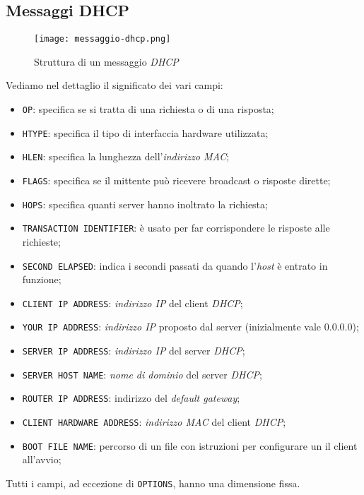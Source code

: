 \subsection{Messaggi DHCP}
\begin{figure}[h!]
    \centering
    \texttt{[image: messaggio-dhcp.png]}
    \caption{Struttura di un messaggio \emph{DHCP}}
\end{figure}\noindent
Vediamo nel dettaglio il significato dei vari campi:
\begin{itemize}
    \item \texttt{OP}: specifica se si tratta di una richiesta o di una risposta;
    \item \texttt{HTYPE}: specifica il tipo di interfaccia hardware utilizzata;
    \item \texttt{HLEN}: specifica la lunghezza dell'\emph{indirizzo MAC};
    \item \texttt{FLAGS}: specifica se il mittente può ricevere broadcast o
    risposte dirette;
    \item \texttt{HOPS}: specifica quanti server hanno inoltrato la richiesta;
    \item \texttt{TRANSACTION IDENTIFIER}: è usato per far corrispondere le
    risposte alle richieste;
    \item \texttt{SECOND ELAPSED}: indica i secondi passati da quando l'\emph{host}
    è entrato in funzione;
    \item \texttt{CLIENT IP ADDRESS}: \emph{indirizzo IP} del client \emph{DHCP};
    \item \texttt{YOUR IP ADDRESS}: \emph{indirizzo IP} proposto dal server
    (inizialmente vale $0.0.0.0$);
    \item \texttt{SERVER IP ADDRESS}: \emph{indirizzo IP} del server \emph{DHCP};
    \item \texttt{SERVER HOST NAME}: \emph{nome di dominio} del server \emph{DHCP};
    \item \texttt{ROUTER IP ADDRESS}: indirizzo del \emph{default gateway};
    \item \texttt{CLIENT HARDWARE ADDRESS}: \emph{indirizzo MAC} del client \emph{DHCP};
    \item \texttt{BOOT FILE NAME}: percorso di un file con istruzioni per configurare
    un il client all'avvio;
\end{itemize}
\begin{note}
    Tutti i campi, ad eccezione di \texttt{OPTIONS}, hanno una dimensione fissa.
\end{note}

